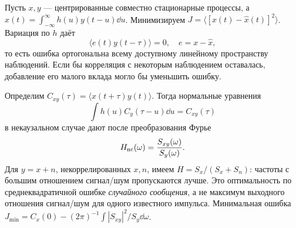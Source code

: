 
Пусть $x,y$ — центрированные совместно стационарные процессы, а $\hat x(t)=\int_{-\infty}^{\infty}h(u)y(t-u)\dd u$. Минимизируем $J=\langle[x(t)-\hat x(t)]^2\rangle$. Вариация по $h$ даёт
\begin{equation}
 \langle e(t)y(t-\tau)\rangle=0,\quad e=x-\hat x,
\end{equation}
то есть ошибка ортогональна всему доступному линейному пространству наблюдений. Если бы корреляция с некоторым наблюдением оставалась, добавление его малого вклада могло бы уменьшить ошибку.

Определим $C_{xy}(\tau)=\langle x(t+\tau)y(t)\rangle$. Тогда нормальные уравнения
\begin{equation}
 \int h(u)C_y(\tau-u)\dd u=C_{xy}(\tau)
\end{equation}
в некаузальном случае дают после преобразования Фурье
\begin{equation}
 H_{\rm nc}(\omega)=\frac{S_{xy}(\omega)}{S_y(\omega)}.
\end{equation}
Для $y=x+n$, некоррелированных $x,n$, имеем $H=S_x/(S_x+S_n)$: частоты с большим отношением сигнал/шум пропускаются лучше. Это оптимальность по среднеквадратичной ошибке \emph{случайного сообщения}, а не максимум выходного отношения сигнал/шум для одного известного импульса. Минимальная ошибка $J_{\min}=C_x(0)-(2\pi)^{-1}\int|S_{xy}|^2/S_y\dd\omega$.
